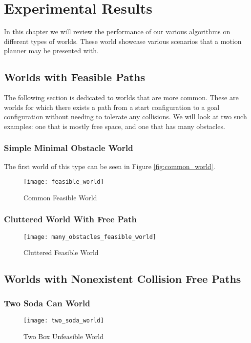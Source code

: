 \chapter{Experimental Results}
In this chapter we will review the performance of our various algorithms on different types of worlds. These world showcase various scenarios that a motion planner may be presented with. 
\section{Worlds with Feasible Paths}
The following section is dedicated to worlds that are more common. These are worlds for which there exists a path from a start configuration to a goal configuration without needing to tolerate any collisions. We will look at two such examples: one that is mostly free space, and one that has many obstacles.

\subsection{Simple Minimal Obstacle World}
The first world of this type can be seen in Figure \ref{fig:common_world}.

\begin{figure}[h]
    \centering
    \texttt{[image: feasible\_world]}
    \caption{Common Feasible World}
    \label{fig:feasible_world}
\end{figure}

\subsection{Cluttered World With Free Path}

\begin{figure}[h]
    \centering
    \texttt{[image: many\_obstacles\_feasible\_world]}
    \caption{Cluttered Feasible World}
    \label{fig:many_obstacles_feasible_world}
\end{figure}

\section{Worlds with Nonexistent Collision Free Paths}

\subsection{Two Soda Can World}
\begin{figure}[h]
    \centering
    \texttt{[image: two\_soda\_world]}
    \caption{Two Box Unfeasible World}
    \label{fig:two_soda_world}
\end{figure}


